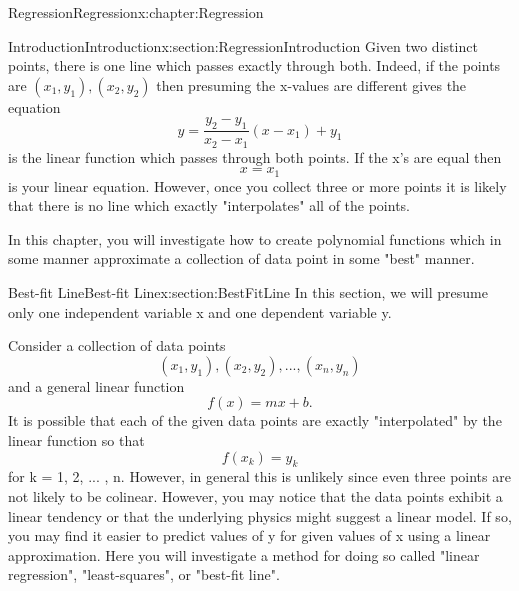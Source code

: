 \documentclass[oneside,10pt,]{book}
\numberwithin{equation}{section}
\begin{document}
%
%
\typeout{************************************************}
\typeout{************************************************}
%
\begin{chapterptx}{Regression}{}{Regression}{}{}{x:chapter:Regression}
%
%
\typeout{************************************************}
\typeout{************************************************}
%
\begin{sectionptx}{Introduction}{}{Introduction}{}{}{x:section:RegressionIntroduction}
Given two distinct points, there is one line which passes exactly through both.  Indeed, if the points are \((x_1,y_1), (x_2,y_2)\) then presuming the x-values are different gives the equation%
\begin{equation*}
y = \frac{y_2 - y_1}{x_2 - x_1}(x - x_1) + y_1
\end{equation*}
is the linear function which passes through both points.  If the x's are equal then%
\begin{equation*}
x = x_1
\end{equation*}
is your linear equation. However, once you collect three or more points it is likely that there is no line which exactly "interpolates" all of the points.%
\par
In this chapter, you will investigate how to create polynomial functions which in some manner approximate a collection of data point in some "best" manner.%
\end{sectionptx}
%
%
\typeout{************************************************}
\typeout{************************************************}
%
\begin{sectionptx}{Best-fit Line}{}{Best-fit Line}{}{}{x:section:BestFitLine}
In this section, we will presume only one independent variable x and one dependent variable y.%
\par
Consider a collection of data points%
\begin{equation*}
(x_1,y_1), (x_2,y_2), ... , (x_n,y_n)
\end{equation*}
and a general linear function%
\begin{equation*}
f(x) = mx + b.
\end{equation*}
It is possible that each of the given data points are exactly "interpolated" by the linear function so that%
\begin{equation*}
f(x_k) = y_k
\end{equation*}
for k = 1, 2, ... , n.  However, in general this is unlikely since even three points are not likely to be colinear. However, you may notice that the data points exhibit a linear tendency or that the underlying physics might suggest a linear model. If so, you may find it easier to predict values of y for given values of x using a linear approximation. Here you will investigate a method for doing so called "linear regression", "least-squares", or "best-fit line".%

\end{sectionptx}
\end{chapterptx}
\end{document}
